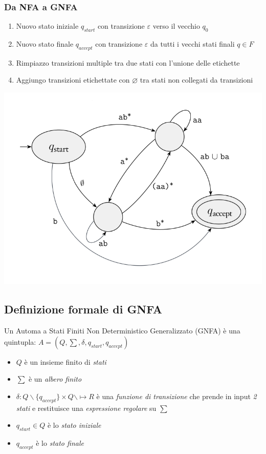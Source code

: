 \subsubsection{Da NFA a GNFA}
\mezzapagina
\begin{enumerate}
	\item Nuovo stato iniziale $q_{start}$ con transizione $\varepsilon$ verso il vecchio $q_0$ 
	\item Nuovo stato finale $q_{accept}$ con transizione $\varepsilon$ da tutti i vecchi stati finali $q\in F$ 
	\item Rimpiazzo transizioni multiple tra due stati con l'unione delle etichette
	\item Aggiungo transizioni etichettate con $\varnothing$ tra stati non collegati da transizioni
\end{enumerate}
\spazio
\begin{center}
	\includegraphics[scale=0.5]{img/NFAtoGNFA.png} 
\end{center}
\finemezzapagina
\subsection{Definizione formale di GNFA}
Un Automa a Stati Finiti Non Deterministico Generalizzato (GNFA) è una quintupla:
	$A=(Q, \sum, \delta, q_{start}, q_{accept})$
\begin{itemize}
	\item $Q$ è un insieme finito di \textit{stati}
	\item $\sum$ è un \textit{albero finito}
	\item $\delta : Q \backslash \{q_{accept}\} \times Q \backslash \mapsto R$ è una \textit{funzione di transizione} che prende in input \textit{2 stati} e restituisce 
		una \textit{espressione regolare} su $\sum$
	\item $q_{start} \in Q$ è lo \textit{stato iniziale}
	\item $q_{accept}$ è lo \textit{stato finale}
\end{itemize}
